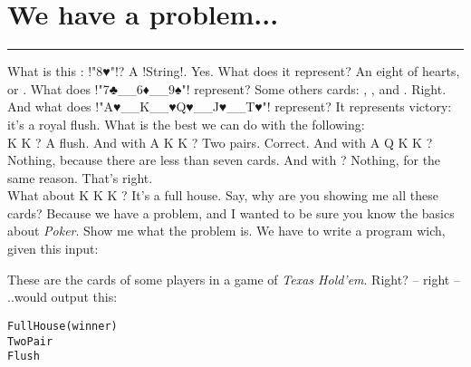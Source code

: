 
 \newpage
\section{We have a problem...} 
\vspace{10cm}
\hrule

\lhQ What is this : \il!"8♥"!?
\lhA A \il!String!.
\lhN Yes. What does it represent?
\lhA An eight of hearts, or .
\lhN What does \il!"7♣__6♦__9♠"! represent?
\lhA Some others cards: , , and .
\lhN Right. And what does \il!"A♥__K__♥Q♥__J♥__T♥"! represent?
\lhA It represents victory: it's a royal flush.
\lhN What is the best we can do with the following: \\
   \spades K \diamonds K   ?
\lhA A flush.
\lhN And with  \hearts A \spades K \diamonds K   ?
\lhA Two pairs.
\lhN Correct. And with \clubs A \clubs Q \spades K \diamonds K  ?
\lhA Nothing, because there are less than seven cards.
\lhN And with  ?
\lhA Nothing, for the same reason.
\lhN That's right. \\
What about \clubs K  \spades K \diamonds K    ?
\lhA It's a full house. Say, why are you showing me all these cards?
\lhN Because we have a problem, and I wanted to be sure you know the basics about \emph{Poker}.
\lhA Show me what the problem is.
\lhN We have to write a program wich, given this input:
\begin{alltt}
      
      
     
 
      
    
\end{alltt}
 
\lhA These are the cards of some players in a game of \emph{Texas Hold'em}. Right?
\lhN -- right -- ..would output this:
\begin{alltt}
       Full House (winner)
       Two Pair
      
  
       Flush
     
\end{alltt}
 
